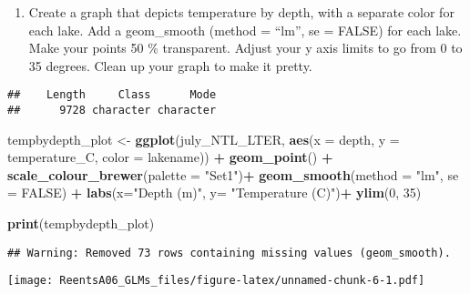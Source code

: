 \documentclass[]{article}
\newenvironment{Shaded}{\begin{snugshade}}{\end{snugshade}}
\newcommand{\KeywordTok}[1]{\textcolor[rgb]{0.13,0.29,0.53}{\textbf{#1}}}
\newcommand{\DataTypeTok}[1]{\textcolor[rgb]{0.13,0.29,0.53}{#1}}
\newcommand{\DecValTok}[1]{\textcolor[rgb]{0.00,0.00,0.81}{#1}}
\newcommand{\StringTok}[1]{\textcolor[rgb]{0.31,0.60,0.02}{#1}}
\newcommand{\CommentTok}[1]{\textcolor[rgb]{0.56,0.35,0.01}{\textit{#1}}}
\newcommand{\OtherTok}[1]{\textcolor[rgb]{0.56,0.35,0.01}{#1}}
\newcommand{\OperatorTok}[1]{\textcolor[rgb]{0.81,0.36,0.00}{\textbf{#1}}}
\newcommand{\NormalTok}[1]{#1}
\providecommand{\tightlist}{%
  \setlength{\itemsep}{0pt}\setlength{\parskip}{0pt}}
\begin{document}
\begin{enumerate}
\def\labelenumi{\arabic{enumi}.}
\setcounter{enumi}{15}
\tightlist
\item
  Create a graph that depicts temperature by depth, with a separate
  color for each lake. Add a geom\_smooth (method = ``lm'', se = FALSE)
  for each lake. Make your points 50 \% transparent. Adjust your y axis
  limits to go from 0 to 35 degrees. Clean up your graph to make it
  pretty.
\end{enumerate}

\begin{Shaded}
\end{Shaded}

\begin{verbatim}
##    Length     Class      Mode 
##      9728 character character
\end{verbatim}

\begin{Shaded}
\begin{Highlighting}[]
\NormalTok{tempbydepth_plot <-}\StringTok{ }\KeywordTok{ggplot}\NormalTok{(july_NTL_LTER, }\KeywordTok{aes}\NormalTok{(}\DataTypeTok{x =}\NormalTok{ depth, }\DataTypeTok{y =}\NormalTok{ temperature_C, }\DataTypeTok{color =}\NormalTok{ lakename)) }\OperatorTok{+}\StringTok{ }
\StringTok{  }\KeywordTok{geom_point}\NormalTok{() }\OperatorTok{+}\StringTok{ }
\StringTok{  }\KeywordTok{scale_colour_brewer}\NormalTok{(}\DataTypeTok{palette =} \StringTok{"Set1"}\NormalTok{)}\OperatorTok{+}
\StringTok{  }\KeywordTok{geom_smooth}\NormalTok{(}\DataTypeTok{method =} \StringTok{"lm"}\NormalTok{, }\DataTypeTok{se =} \OtherTok{FALSE}\NormalTok{) }\OperatorTok{+}
\StringTok{  }\KeywordTok{labs}\NormalTok{(}\DataTypeTok{x=}\StringTok{"Depth (m)"}\NormalTok{, }\DataTypeTok{y=} \StringTok{"Temperature (C)"}\NormalTok{)}\OperatorTok{+}
\StringTok{  }\KeywordTok{ylim}\NormalTok{(}\DecValTok{0}\NormalTok{, }\DecValTok{35}\NormalTok{)}

\KeywordTok{print}\NormalTok{(tempbydepth_plot)}
\end{Highlighting}
\end{Shaded}

\begin{verbatim}
## Warning: Removed 73 rows containing missing values (geom_smooth).
\end{verbatim}

\texttt{[image: ReentsA06\_GLMs\_files/figure-latex/unnamed-chunk-6-1.pdf]}
\end{document}
